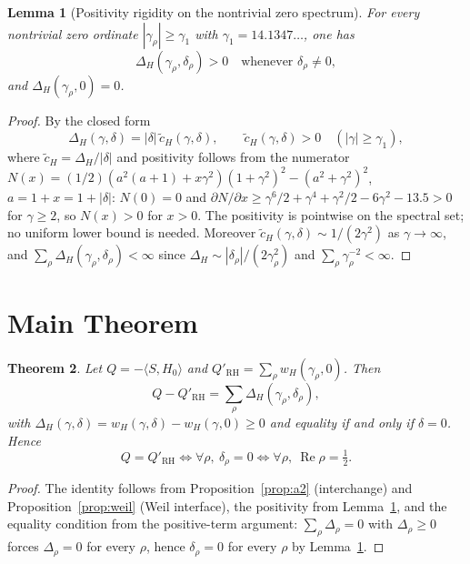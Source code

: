 \documentclass[11pt]{article}
\newtheorem{theorem}{Theorem}[section]
\newtheorem{lemma}[theorem]{Lemma}
\begin{document}
\begin{lemma}[Positivity rigidity on the nontrivial zero spectrum]\label{lem:pos}
For every nontrivial zero ordinate $|\gamma_\rho|\ge\gamma_1$ with
$\gamma_1=14.1347\ldots$, one has
\begin{equation}
\Delta_H(\gamma_\rho,\delta_\rho)>0 \quad \text{whenever }
\delta_\rho\ne0,
\end{equation}
and $\Delta_H(\gamma_\rho,0)=0$.
\end{lemma}

\begin{proof}
By the closed form
\begin{equation}
\Delta_H(\gamma,\delta)=|\delta|\,\widetilde c_H(\gamma,\delta),
\qquad
\widetilde c_H(\gamma,\delta)>0 \quad (|\gamma|\ge\gamma_1),
\label{eq:ctilde}
\end{equation}
where $\widetilde c_H=\Delta_H/|\delta|$ and positivity follows from the
numerator $N(x)=(1/2)(a^2(a+1)+x\gamma^2)(1+\gamma^2)^2-(a^2+\gamma^2)^2$,
$a=1+x=1+|\delta|$: $N(0)=0$ and $\partial N/\partial x\ge
\gamma^6/2+\gamma^4+\gamma^2/2-6\gamma^2-13.5>0$ for $\gamma\ge2$, so
$N(x)>0$ for $x>0$.  The positivity is pointwise on the spectral set; no
uniform lower bound is needed.  Moreover
$\widetilde c_H(\gamma,\delta)\sim 1/(2\gamma^2)$ as $\gamma\to\infty$,
and $\sum_\rho\Delta_H(\gamma_\rho,\delta_\rho)<\infty$ since
$\Delta_H\sim|\delta_\rho|/(2\gamma_\rho^2)$ and
$\sum_\rho\gamma_\rho^{-2}<\infty$.
\end{proof}

\section{Main Theorem}

\begin{theorem}\label{thm:main}
Let $Q=-\langle S,H_0\rangle$ and
$Q'_{\mathrm{RH}}=\sum_\rho w_H(\gamma_\rho,0)$.  Then
\begin{equation}
Q-Q'_{\mathrm{RH}}=\sum_\rho \Delta_H(\gamma_\rho,\delta_\rho),
\end{equation}
with $\Delta_H(\gamma,\delta)=w_H(\gamma,\delta)-w_H(\gamma,0)\ge0$ and
equality if and only if $\delta=0$.  Hence
\begin{equation}
Q=Q'_{\mathrm{RH}} \iff \forall\rho,\ \delta_\rho=0
\iff \forall\rho,\ \operatorname{Re}\rho=\tfrac12.
\end{equation}
\end{theorem}

\begin{proof}
The identity follows from Proposition~\ref{prop:a2} (interchange) and
Proposition~\ref{prop:weil} (Weil interface), the positivity from
Lemma~\ref{lem:pos}, and the equality condition from the positive-term
argument: $\sum_\rho\Delta_\rho=0$ with $\Delta_\rho\ge0$ forces
$\Delta_\rho=0$ for every $\rho$, hence $\delta_\rho=0$ for every $\rho$
by Lemma~\ref{lem:pos}.
\end{proof}
\end{document}
